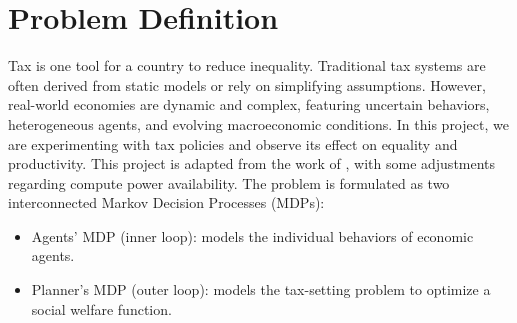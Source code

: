 \section{Problem Definition}

Tax is one tool for a country to reduce inequality. Traditional tax systems are often derived from static models or rely on simplifying assumptions. However, real-world economies are dynamic and complex, featuring uncertain behaviors, heterogeneous agents, and evolving macroeconomic conditions. In this project, we are experimenting with tax policies and observe its effect on equality and productivity. This project is adapted from the work of \cite{zheng_2020_aieconomist}, with some adjustments regarding compute power availability. The problem is formulated as two interconnected Markov Decision Processes (MDPs):
\begin{itemize}
    \item Agents' MDP (inner loop): models the individual behaviors of economic agents.
    \item Planner's MDP (outer loop): models the tax-setting problem to optimize a social welfare function.
\end{itemize}

